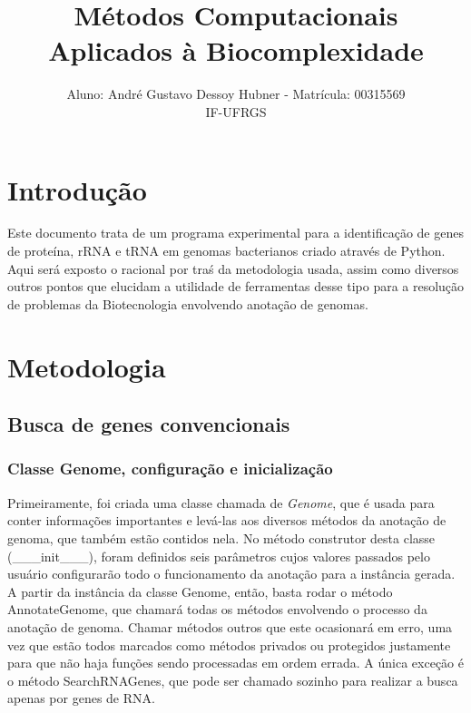 \documentclass[brazilian,12pt,a4paper,final]{article}
\title{Métodos Computacionais Aplicados à Biocomplexidade}
\author{Aluno: André Gustavo Dessoy Hubner - Matrícula: 00315569 \\ IF-UFRGS}
\begin{document}
	\maketitle
	
	\section{Introdu\c{c}\~ao} 
	\indent 
	Este documento trata de um programa experimental para a identificação de genes de proteína, rRNA e tRNA em genomas
	bacterianos criado através de Python.
	Aqui será exposto o racional por traś da metodologia usada, assim como diversos outros pontos que
	elucidam a utilidade de ferramentas desse tipo para a resolução de problemas da Biotecnologia
	envolvendo anotação de genomas.
	
	\section{Metodologia}
	\subsection{Busca de genes convencionais}
	\subsubsection{Classe Genome, configuração e inicialização}
	Primeiramente, foi criada uma classe chamada de \textit{Genome}, que é usada para conter informações
	importantes e levá-las aos diversos métodos da anotação de genoma, que também estão contidos nela. No
	método construtor desta classe (\_\_\_init\_\_\_), foram definidos seis parâmetros cujos valores passados 
	pelo usuário configurarão todo o funcionamento da anotação para a instância gerada. A partir da instância
	da classe Genome, então, basta rodar o método AnnotateGenome, que chamará todas os métodos envolvendo 
	o processo da anotação de genoma. Chamar métodos outros que este ocasionará em erro, uma vez que estão todos 
	marcados como métodos privados ou protegidos justamente para que não haja funções sendo processadas em ordem errada. A única
	exceção é o método SearchRNAGenes, que pode ser chamado sozinho para realizar a busca apenas por genes de
	RNA.
	
	\vspace{0.5cm}
	
\end{document}
